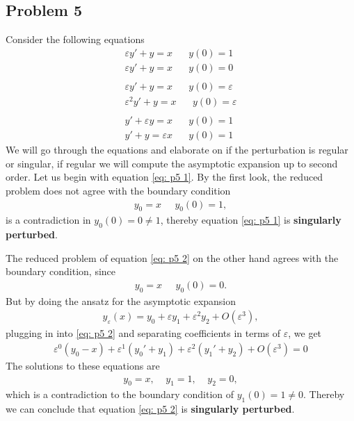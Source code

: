 \documentclass[a4paper]{article}
\newcommand{\eps}{\varepsilon}
\begin{document}
\subsection{Problem 5}
Consider the following equations
\begin{align}
    \label{eq: p5 1}\eps y' + y = x \;\;\;\;\;\; y(0) = 1\\
    \label{eq: p5 2}\eps y' + y = x \;\;\;\;\;\; y(0) = 0\\
    \nonumber\\
    \label{eq: p5 3}\eps y' + y = x \;\;\;\;\;\; y(0) = \eps\\
    \label{eq: p5 4}\eps^2 y' + y = x \;\;\;\;\;\; y(0) = \eps\\
    \nonumber\\
    \label{eq: p5 5}y' + \eps y = x \;\;\;\;\;\; y(0) = 1\\
    \label{eq: p5 6}y' + y = \eps x \;\;\;\;\;\; y(0) = 1
\end{align}
We will go through the equations and elaborate on if the perturbation is
regular or singular, if regular we will compute the asymptotic expansion up
to second order.
Let us begin with equation \ref{eq: p5 1}. By the first look, the reduced
problem does not agree with the boundary condition
\begin{align}
    y_0 = x \;\;\;\;\; y_0(0) = 1,
\end{align}
is a contradiction in $y_0(0) = 0 \neq 1$, thereby equation \ref{eq: p5 1} is
\textbf{singularly perturbed}.

The reduced problem of equation \ref{eq: p5 2} on the other hand agrees with
the boundary condition, since
\begin{align}
    y_0 = x \;\;\;\;\; y_0(0) = 0.
\end{align}
But by doing the ansatz for the asymptotic expansion
\begin{align}
    y_\eps(x) = y_0 + \eps y_1 + \eps^2 y_2 + O(\eps^3),
\end{align}
plugging in into \ref{eq: p5 2} and separating coefficients in terms of
$\eps$, we get
\begin{align}
    \eps^0 (y_0 -x) + \eps^1(y_0' + y_1) + \eps^2(y_1' + y_2) + O(\eps^3) = 0
\end{align}
The solutions to these equations are
\begin{align}
    y_0 = x, \;\;\;\; y_1 = 1, \;\;\;\; y_2 = 0,
\end{align}
which is a contradiction to the boundary condition of $y_1(0) = 1 \neq 0$.
Thereby we can conclude that equation \ref{eq: p5 2} is \textbf{singularly
perturbed}.
\end{document}
